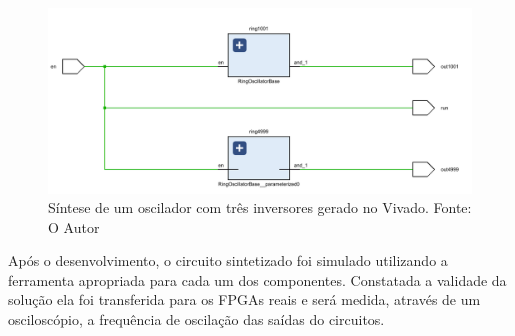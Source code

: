 \begin{figure}[H]
    \centering
    \includegraphics[width=\linewidth]{figures/ZedBoard_RTL_Schematic.png}
    \caption{Síntese de um oscilador com três inversores gerado no Vivado. Fonte: O Autor}
    \label{fig:ZedRtlSchem1}
\end{figure}

Após o desenvolvimento, o circuito sintetizado foi simulado utilizando a ferramenta apropriada para cada um dos componentes. Constatada a validade da solução ela foi transferida para os FPGAs reais e será medida, através de um osciloscópio, a frequência de oscilação das saídas do circuitos.
